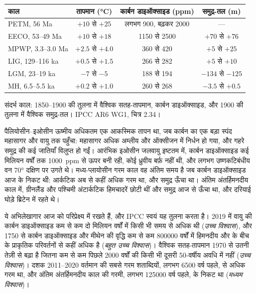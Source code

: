 \begin{center}
\small
\begin{tabular}{|l|c|c|c|}
\hline
\textbf{काल} & \textbf{तापमान (\unit{\degreeCelsius})} & \textbf{कार्बन डाइऑक्साइड (ppm)} & \textbf{समुद्र-तल (m)} \\
\hline
PETM, 56 Ma & $+10$ से $+25$ & लगभग 900, बढ़कर 2000 & --- \\
EECO, 53--49 Ma & $+10$ से $+18$ & 1150 से 2500 & $+70$ से $+76$ \\
MPWP, 3.3--3.0 Ma & $+2.5$ से $+4.0$ & 360 से 420 & $+5$ से $+25$ \\
LIG, 129--116 ka & $+0.5$ से $+1.5$ & 266 से 282 & $+5$ से $+10$ \\
\textcolor{omCold}{LGM, 23--19 ka} & \textcolor{omCold}{$-7$ से $-5$} & \textcolor{omCold}{188 से 194} & \textcolor{omCold}{$-134$ से $-125$} \\
MH, 6.5--5.5 ka & $+0.2$ से $+1.0$ & 260 से 268 & $-3.5$ से $+0.5$ \\
\hline
\end{tabular}

\medskip
{\small संदर्भ काल: 1850--1900 की तुलना में वैश्विक सतह-तापमान,
कार्बन डाइऑक्साइड, और 1900 की तुलना में वैश्विक समुद्र-तल। IPCC
AR6 WG1, चित्र 2.34।}
\end{center}

पैलियोसीन--इओसीन ऊष्मीय अधिकतम एक आकस्मिक तापन था, जब कार्बन का एक बड़ा
स्पंद महासागर और वायु तक पहुँचा: महासागर अधिक अम्लीय
और ऑक्सीजन में निर्धन हो गया, और गहरे समुद्र की कई जातियाँ विलुप्त हो गईं। आरंभिक इओसीन
जलवायु इष्टतम में, कार्बन डाइऑक्साइड कई मिलियन वर्षों तक \qty{1000}{ppm} से ऊपर
बनी रही, कोई ध्रुवीय बर्फ़ नहीं थी, और लगभग उष्णकटिबंधीय वन
\ang{70} दक्षिण पर उगते थे। मध्य-प्लायोसीन गरम काल वह अंतिम समय है जब कार्बन
डाइऑक्साइड आज के निकट थी: आर्कटिक अब से कहीं अधिक गरम था, और समुद्र
ऊँचा था। अंतिम अंतर्हिमनदीय काल में, ग्रीनलैंड और पश्चिमी अंटार्कटिक हिमचादरें
छोटी थीं और समुद्र आज से ऊँचा था, और दरियाई घोड़े
ब्रिटेन में रहते थे।

ये अभिलेखागार आज को परिप्रेक्ष्य में रखते हैं, और IPCC स्वयं यह तुलना
करता है। 2019 में वायु की कार्बन डाइऑक्साइड कम से कम दो मिलियन वर्षों में किसी भी
समय से अधिक थी (\emph{उच्च विश्वास}), और 1750 से कार्बन
डाइऑक्साइड और मीथेन की वृद्धि कम से कम \num{800000} वर्षों में हिमनदीय
और  के बीच के प्राकृतिक परिवर्तनों से कहीं अधिक है (\emph{बहुत उच्च
विश्वास})। वैश्विक सतह-तापमान 1970 से उतनी तेज़ी से बढ़ा है जितना
कम से कम पिछले \num{2000} वर्षों की किसी भी दूसरी 50-वर्षीय अवधि में नहीं
(\emph{उच्च विश्वास})। दशक 2011--2020 वर्तमान  की सबसे गरम
शताब्दियों, लगभग \num{6500} वर्ष पहले, से अधिक गरम था, और
अंतिम अंतर्हिमनदीय काल की गरमी, लगभग \num{125000} वर्ष पहले, के निकट था
(\emph{मध्यम विश्वास})।

